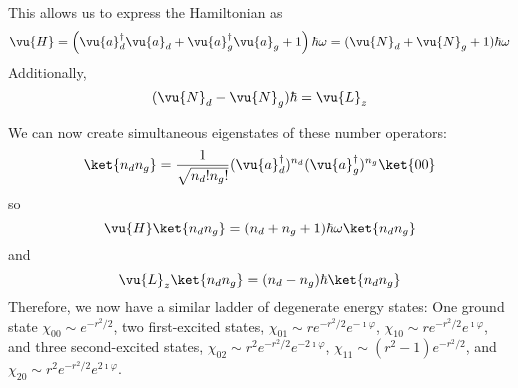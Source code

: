 \documentclass[a4paper,twoside,master.tex]{subfiles}
\begin{document}
\begin{ex}
    This allows us to express the Hamiltonian as
    \begin{equation}
        \vu{H} = \left( \vu{a}^\dagger_d \vu{a}_d + \vu{a}^\dagger_g \vu{a}_g + 1 \right) \hbar \omega = ( \vu{N}_d + \vu{N}_g + 1) \hbar \omega
    \end{equation}
    Additionally,
    \begin{equation}
        ( \vu{N}_d - \vu{N}_g) \hbar = \vu{L}_z
    \end{equation}

    We can now create simultaneous eigenstates of these number operators:
    \begin{equation}
        \ket{n_d n_g} = \frac{1}{\sqrt{n_d! n_g!}} ( \vu{a}^\dagger_d)^{n_d} ( \vu{a}^\dagger_g)^{n_g}\ket{00}
    \end{equation}
    so
    \begin{equation}
        \vu{H}\ket{n_d n_g} = (n_d + n_g + 1) \hbar \omega\ket{n_d n_g}
    \end{equation}
    and
    \begin{equation}
        \vu{L}_z\ket{n_d n_g} = (n_d - n_g) \hbar\ket{n_d n_g}
    \end{equation}
    Therefore, we now have a similar ladder of degenerate energy states: One ground state $ \chi_{00} \sim e^{- r^2 / 2}  $, two first-excited states, $ \chi_{01} \sim r e^{- r^2 / 2} e^{- \imath \varphi}  $, $ \chi_{10} \sim r e^{-r^2 / 2} e^{\imath \varphi} $, and three second-excited states, $ \chi_{02} \sim r^2 e^{- r^2 / 2} e^{-2 \imath \varphi} $, $ \chi_{11} \sim (r^2 - 1) e^{- r^2 / 2} $, and $ \chi_{20} \sim r^2 e^{-r^2 / 2} e^{2 \imath \varphi} $.
\end{ex}
\end{document}
